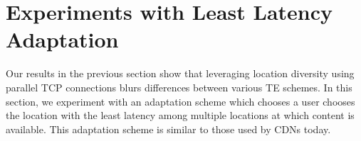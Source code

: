 \section{Experiments with Least Latency Adaptation}

Our results in the previous section show that leveraging location diversity using parallel TCP connections blurs differences between various TE schemes. In this section, we experiment with an adaptation scheme which chooses a user chooses the location with the least latency among multiple locations at which content is available. This adaptation scheme is similar to those used by CDNs today. 

